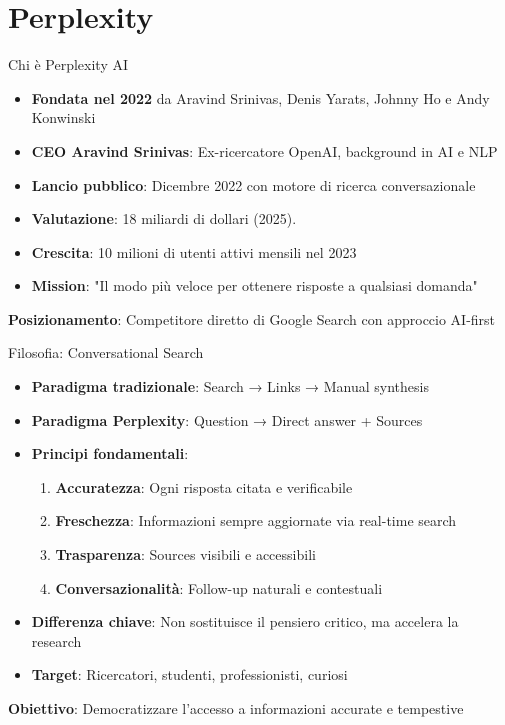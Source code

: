 \documentclass[aspectratio=169]{beamer}
\begin{document}
\section{Perplexity}
%
%
\begin{frame}{Chi è Perplexity AI}
\begin{itemize}
    \item \textbf{Fondata nel 2022} da Aravind Srinivas, Denis Yarats, Johnny Ho e Andy Konwinski
    \item \textbf{CEO Aravind Srinivas}: Ex-ricercatore OpenAI, background in AI e NLP
    \item \textbf{Lancio pubblico}: Dicembre 2022 con motore di ricerca conversazionale
    \item \textbf{Valutazione}: 18 miliardi di dollari (2025).
    \item \textbf{Crescita}: 10 milioni di utenti attivi mensili nel 2023
    \item \textbf{Mission}: "Il modo più veloce per ottenere risposte a qualsiasi domanda"
\end{itemize}

\vspace{0.5cm}
\textbf{Posizionamento}: Competitore diretto di Google Search con approccio AI-first
\end{frame}
%
%
\begin{frame}{Filosofia: Conversational Search}
\begin{itemize}
    \item \textbf{Paradigma tradizionale}: Search → Links → Manual synthesis
    \item \textbf{Paradigma Perplexity}: Question → Direct answer + Sources
    \item \textbf{Principi fondamentali}:
    \begin{enumerate}
    \normalsize
        \item \textbf{Accuratezza}: Ogni risposta citata e verificabile
        \item \textbf{Freschezza}: Informazioni sempre aggiornate via real-time search
        \item \textbf{Trasparenza}: Sources visibili e accessibili
        \item \textbf{Conversazionalità}: Follow-up naturali e contestuali
    \end{enumerate}
    \item \textbf{Differenza chiave}: Non sostituisce il pensiero critico, ma accelera la research
    \item \textbf{Target}: Ricercatori, studenti, professionisti, curiosi
\end{itemize}

\vspace{0.3cm}
\textbf{Obiettivo}: Democratizzare l'accesso a informazioni accurate e tempestive
\end{frame}
\end{document}
